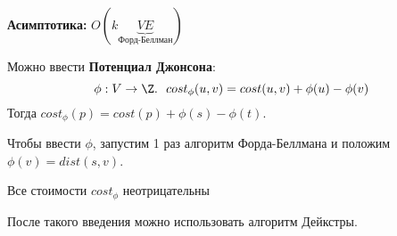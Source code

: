 \textbf{Асимптотика:} $O(k\underbrace{VE}_{\text{Форд-Беллман}})$

Можно ввести \textbf{Потенциал Джонсона}:
$$\phi: V \to \Z. \ \ cost_\phi(u, v) = cost(u,v) + \phi(u) - \phi(v) $$
Тогда  $cost_\phi(p) = cost(p) + \phi(s) - \phi(t)$.

Чтобы ввести $\phi$, запустим 1 раз алгоритм Форда-Беллмана и положим $\phi(v) = dist(s, v)$. 

\begin{proposition}
  Все стоимости $cost_\phi$ неотрицательны
\end{proposition}

После такого введения можно использовать алгоритм Дейкстры.


